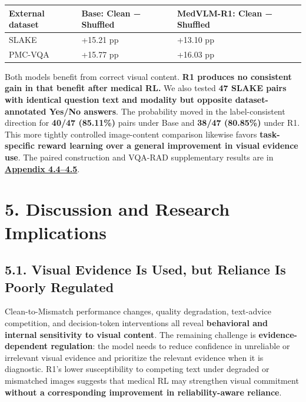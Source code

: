 \documentclass[
  10pt,
  a4paper,
]{article}
\newcounter{none} %
\begin{document}
{\def\LTcaptype{none} %
\begin{longtable}[]{@{}
  >{\raggedright\arraybackslash}p{}
  >{\raggedleft\arraybackslash}p{}
  >{\raggedleft\arraybackslash}p{}@{}}
\toprule\noalign{}
\begin{minipage}[b]{\linewidth}\raggedright
External dataset
\end{minipage} & \begin{minipage}[b]{\linewidth}\raggedleft
Base: Clean − Shuffled
\end{minipage} & \begin{minipage}[b]{\linewidth}\raggedleft
MedVLM-R1: Clean − Shuffled
\end{minipage} \\
\midrule\noalign{}
\endhead
\bottomrule\noalign{}
\endlastfoot
SLAKE & +15.21 pp & +13.10 pp \\
PMC-VQA & +15.77 pp & +16.03 pp \\
\end{longtable}
}

Both models benefit from correct visual content. \textbf{R1 produces no
consistent gain in that benefit after medical RL.} We also tested
\textbf{47 SLAKE pairs with identical question text and modality but
opposite dataset-annotated Yes/No answers}. The probability moved in the
label-consistent direction for \textbf{40/47 (85.11\%)} pairs under Base
and \textbf{38/47 (80.85\%)} under R1. This more tightly controlled
image-content comparison likewise favors \textbf{task-specific reward
learning over a general improvement in visual evidence use}. The paired
construction and VQA-RAD supplementary results are in
\textbf{\hyperref[image-content-relevance-and-opposite-label-pairs]{Appendix
4.4--4.5}}.

\section{5. Discussion and Research
Implications}\label{discussion-and-research-implications}

\subsection{5.1. Visual Evidence Is Used, but Reliance Is Poorly
Regulated}\label{visual-evidence-is-used-but-reliance-is-poorly-regulated}

Clean-to-Mismatch performance changes, quality degradation, text-advice
competition, and decision-token interventions all reveal
\textbf{behavioral and internal sensitivity to visual content}. The
remaining challenge is \textbf{evidence-dependent regulation}: the model
needs to reduce confidence in unreliable or irrelevant visual evidence
and prioritize the relevant evidence when it is diagnostic. R1's lower
susceptibility to competing text under degraded or mismatched images
suggests that medical RL may strengthen visual commitment
\textbf{without a corresponding improvement in reliability-aware
reliance}.
\end{document}

